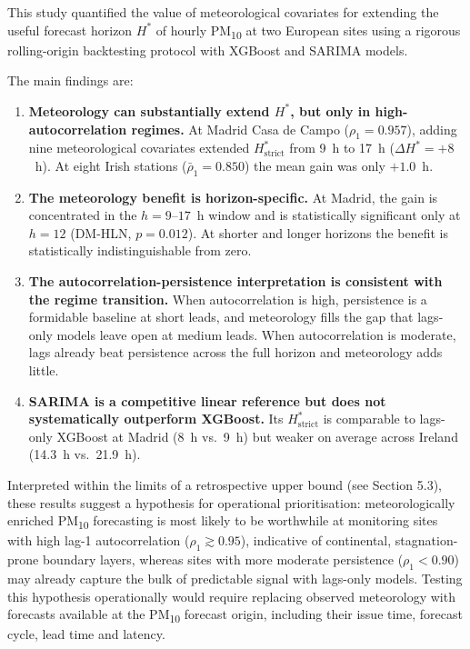 \documentclass[12pt,a4paper]{article}
\newcommand{\PMten}{PM\textsubscript{10}}
\begin{document}
This study quantified the value of meteorological covariates for extending the
useful forecast horizon $H^*$ of hourly \PMten{} at two European sites using a
rigorous rolling-origin backtesting protocol with XGBoost and SARIMA models.

The main findings are:

\begin{enumerate}
  \item \textbf{Meteorology can substantially extend $H^*$, but only in
    high-autocorrelation regimes.}  At Madrid Casa de Campo
    ($\rho_1 = 0.957$), adding nine meteorological covariates extended
    $H^*_{\text{strict}}$ from 9~h to 17~h ($\Delta H^* = +8$~h).  At eight
    Irish stations ($\bar{\rho}_1 = 0.850$) the mean gain was only $+1.0$~h.

  \item \textbf{The meteorology benefit is horizon-specific.}  At Madrid,
    the gain is concentrated in the $h = 9$--$17$~h window and is
    statistically significant only at $h = 12$ (DM-HLN, $p = 0.012$).
    At shorter and longer horizons the benefit is statistically
    indistinguishable from zero.

  \item \textbf{The autocorrelation-persistence interpretation is consistent
    with the regime transition.}  When autocorrelation is high, persistence is a formidable
    baseline at short leads, and meteorology fills the gap that lags-only
    models leave open at medium leads.  When autocorrelation is moderate,
    lags already beat persistence across the full horizon and meteorology
    adds little.

  \item \textbf{SARIMA is a competitive linear reference but does not
    systematically outperform XGBoost.}  Its $H^*_{\text{strict}}$ is
    comparable to lags-only XGBoost at Madrid (8~h vs.\ 9~h) but weaker on
    average across Ireland (14.3~h vs.\ 21.9~h).

\end{enumerate}

Interpreted within the limits of a retrospective upper bound (see Section 5.3),
these results suggest a hypothesis for operational prioritisation:
meteorologically enriched \PMten{} forecasting is most likely to be worthwhile
at monitoring sites with high lag-1 autocorrelation ($\rho_1 \gtrsim 0.95$),
indicative of continental, stagnation-prone boundary layers, whereas sites with
more moderate persistence ($\rho_1 < 0.90$) may already capture the bulk of
predictable signal with lags-only models.  Testing this hypothesis operationally
would require replacing observed meteorology with forecasts available at the
\PMten{} forecast origin, including their issue time, forecast cycle, lead time
and latency.
\end{document}
